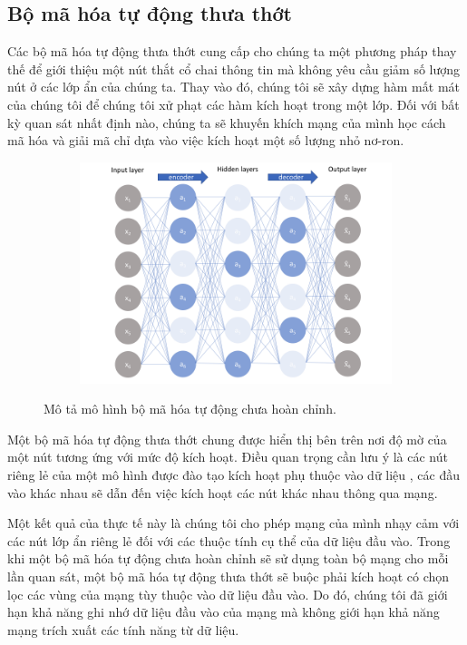 \subsection{Bộ mã hóa tự động thưa thớt}

Các bộ mã hóa tự động thưa thớt cung cấp cho chúng ta một phương pháp
thay thế để giới thiệu một nút thắt cổ chai thông tin mà không
yêu cầu giảm số lượng nút ở các lớp ẩn của chúng ta. Thay vào đó,
chúng tôi sẽ xây dựng hàm mất mát của chúng tôi để chúng tôi
xử phạt các hàm kích hoạt trong một lớp. Đối với bất kỳ quan sát
nhất định nào, chúng ta sẽ khuyến khích mạng của mình học cách mã hóa và
giải mã chỉ dựa vào việc kích hoạt một số lượng nhỏ nơ-ron.

\begin{figure}
    \begin{subfigure}{0.8\textwidth}
        \includegraphics[width=1.\linewidth]{Chapters/items/auto4.jpg}
         
        \label{fig: auto4}
    \end{subfigure}
    \caption{Mô tả mô hình bộ mã hóa tự động chưa hoàn chỉnh.}
\end{figure}

\newpage
Một bộ mã hóa tự động thưa thớt chung được hiển thị bên trên nơi
độ mờ của một nút tương ứng với mức độ kích hoạt. Điều quan
trọng cần lưu ý là các nút riêng lẻ của một mô hình được đào
tạo kích hoạt phụ thuộc vào dữ liệu , các đầu vào khác nhau
sẽ dẫn đến việc kích hoạt các nút khác nhau thông qua mạng.

Một kết quả của thực tế này là chúng tôi cho phép mạng của
mình nhạy cảm với các nút lớp ẩn riêng lẻ đối với các thuộc
tính cụ thể của dữ liệu đầu vào. Trong khi một bộ mã hóa tự động
chưa hoàn chỉnh sẽ sử dụng toàn bộ mạng cho mỗi lần quan sát,
một bộ mã hóa tự động thưa thớt sẽ buộc phải kích hoạt có chọn lọc
các vùng của mạng tùy thuộc vào dữ liệu đầu vào. Do đó, chúng
tôi đã giới hạn khả năng ghi nhớ dữ liệu đầu vào của mạng mà
không giới hạn khả năng mạng trích xuất các tính năng từ dữ liệu.


